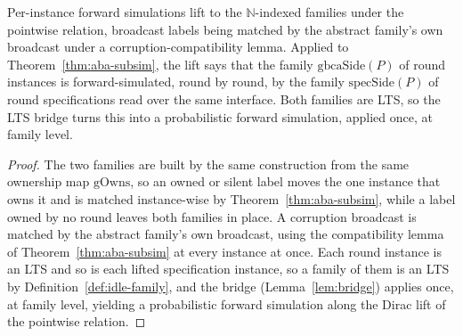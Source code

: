 \begin{theorem}
  \label{thm:gbca-family-refines}
  \leanok
  Per-instance forward simulations lift to the $\mathbb{N}$-indexed families under the pointwise relation, broadcast labels being matched by the abstract family's own broadcast under a corruption-compatibility lemma.
  Applied to Theorem~\ref{thm:aba-subsim}, the lift says that the family $\mathrm{gbcaSide}(P)$ of round instances is forward-simulated, round by round, by the family $\mathrm{specSide}(P)$ of round specifications read over the same interface.
  Both families are LTS, so the LTS bridge turns this into a probabilistic forward simulation, applied once, at family level.
\end{theorem}

\begin{proof}\leanok
  The two families are built by the same construction from the same ownership map $\mathrm{gOwns}$, so an owned or silent label moves the one instance that owns it and is matched instance-wise by Theorem~\ref{thm:aba-subsim}, while a label owned by no round leaves both families in place.
  A corruption broadcast is matched by the abstract family's own broadcast, using the compatibility lemma of Theorem~\ref{thm:aba-subsim} at every instance at once.
  Each round instance is an LTS and so is each lifted specification instance, so a family of them is an LTS by Definition~\ref{def:idle-family}, and the bridge (Lemma~\ref{lem:bridge}) applies once, at family level, yielding a probabilistic forward simulation along the Dirac lift of the pointwise relation.
\end{proof}

